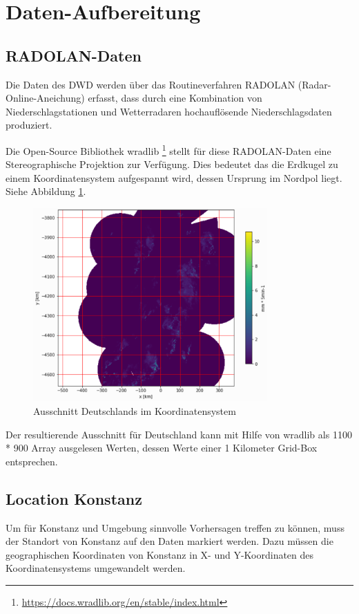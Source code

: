 \section{Daten-Aufbereitung}

\subsection{RADOLAN-Daten}

Die Daten des DWD werden über das Routineverfahren RADOLAN (Radar-Online-Aneichung) erfasst, dass durch eine Kombination von Niederschlagstationen und Wetterradaren hochauflösende Niederschlagsdaten produziert. 

Die Open-Source Bibliothek wradlib \footnote{\url{https://docs.wradlib.org/en/stable/index.html}} stellt für diese RADOLAN-Daten eine Stereographische Projektion zur Verfügung. Dies bedeutet das die Erdkugel zu einem Koordinatensystem aufgespannt wird, dessen Ursprung im Nordpol liegt. Siehe Abbildung  \ref{rz}.

\begin{figure}[H]
	\centering
	\includegraphics[width=0.8\textwidth]{pics/RZ_product.PNG}
	\caption{Ausschnitt Deutschlands im Koordinatensystem}
	\label{rz}
\end{figure}

Der resultierende Ausschnitt für Deutschland kann mit Hilfe von wradlib als 1100 * 900 Array ausgelesen Werten, dessen Werte einer 1 Kilometer Grid-Box entsprechen.

\subsection{Location Konstanz}
Um für Konstanz und Umgebung sinnvolle Vorhersagen treffen zu können, muss der Standort von Konstanz auf den Daten markiert werden. Dazu müssen die geographischen Koordinaten von Konstanz in X- und Y-Koordinaten des Koordinatensystems umgewandelt werden.

